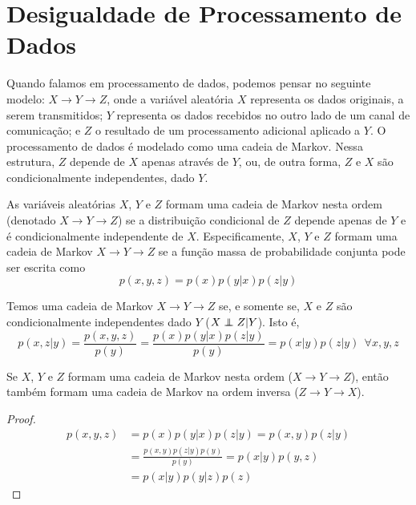 \section{Desigualdade de Processamento de Dados}
Quando falamos em processamento de dados, podemos pensar no seguinte modelo:
$X \rightarrow Y \rightarrow Z$, onde a variável aleatória $X$ representa
os dados originais, a serem transmitidos; $Y$ representa os dados recebidos no outro lado de um canal 
de comunicação; e $Z$ o resultado de um processamento adicional aplicado a $Y$.
O processamento de dados é modelado como uma cadeia de Markov.
Nessa estrutura, $Z$ depende de $X$ apenas através de $Y$,
ou, de outra forma, $Z$ e $X$ são condicionalmente independentes, dado $Y$.


\begin{definition}\label{def:markovchain}
As variáveis aleatórias $X$, $Y$ e $Z$ formam uma cadeia de Markov nesta ordem
(denotado $X \rightarrow Y \rightarrow Z$) se a distribuição condicional de $Z$
depende apenas de $Y$ e é condicionalmente independente de $X$. Especificamente,
$X$, $Y$ e $Z$ formam uma cadeia de Markov $X \rightarrow Y \rightarrow Z$ se
a função massa de probabilidade conjunta pode ser escrita como
\begin{equation}\label{eq:markov}
p(x,y,z) = p(x) p(y|x) p(z|y)
\end{equation}
\end{definition}

Temos uma cadeia de Markov $X \rightarrow Y \rightarrow Z$ se, e somente se,
$X$ e $Z$ são condicionalmente independentes dado $Y$ ($X \independent Z | Y$).
Isto é,
\begin{equation}
p(x,z|y) = \frac{p(x,y,z)}{p(y)} = \frac{p(x)p(y|x)p(z|y)}{p(y)} = p(x|y) p(z|y) \ \ \forall x,y,z
\end{equation}

\begin{proposition}\label{prop:markovinv}
Se $X$, $Y$ e $Z$ formam uma cadeia de Markov nesta ordem ($X \rightarrow Y \rightarrow Z$), então
também formam uma cadeia de Markov na ordem inversa ($Z \rightarrow Y \rightarrow X$).
\end{proposition}
\begin{proof}
\begin{subequations}\label{dem:markovinv}
\begin{align}
p(x,y,z) &= p(x)p(y|x)p(z|y) = p(x,y)p(z|y) \\
         &= \frac{p(x,y)p(z|y)p(y)}{p(y)} = p(x|y) p(y,z) \\
         &= p(x|y) p(y|z) p(z)
\end{align}
\end{subequations}
\end{proof}

